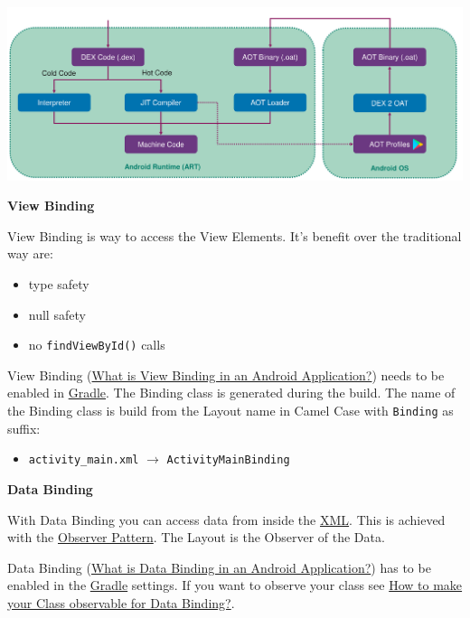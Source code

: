 \documentclass[11pt,twoside,landscape]{article}
\begin{document}
\begin{multicols}{3}
\begin{center}
\includegraphics[width=.9\linewidth]{img/android_build_system_art_2_0.png}
\label{org4486c85}
\end{center}

\textbf{View Binding}

View Binding is way to access the View Elements. It's benefit over the traditional way are:
\begin{itemize}
\item type safety
\item null safety
\item no \texttt{findViewById()} calls
\end{itemize}


View Binding (\href{../../../roam/20211112094953-what_is_view_binding_in_an_android_application.org}{What is View Binding in an Android Application?}) needs to be enabled in \href{../../../roam/20211112095502-gradle.org}{Gradle}.
The Binding class is generated during the build.
The name of the Binding class is build from the Layout name in Camel Case with \texttt{Binding} as suffix:
\begin{itemize}
\item \texttt{activity\_main.xml} \(\rightarrow\) \texttt{ActivityMainBinding}
\end{itemize}

\textbf{Data Binding}

With Data Binding you can access data from inside the \href{../../../roam/20211112100344-xml.org}{XML}.
This is achieved with the \href{../../../roam/20211103140808-observer_pattern.org}{Observer Pattern}.
The Layout is the Observer of the Data.

Data Binding (\href{../../../roam/20211112100504-what_is_data_binding_in_an_android_application.org}{What is Data Binding in an Android Application?}) has to be enabled in the \href{../../../roam/20211112095502-gradle.org}{Gradle} settings.
If you want to observe your class see \href{../../../roam/20211112103257-how_to_make_your_class_observable_for_data_binding.org}{How to make your Class observable for Data Binding?}. 


\end{multicols}
\end{document}
